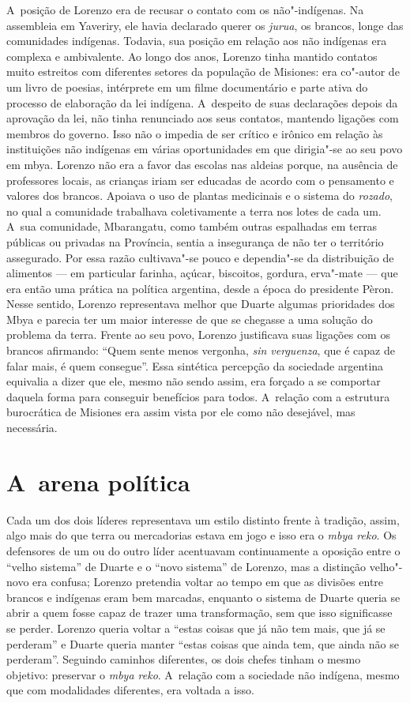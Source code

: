 A~posição de Lorenzo era de recusar o contato com os não"-indígenas. Na
assembleia em Yaveriry, ele havia declarado querer os \emph{jurua}, os
brancos, longe das comunidades indígenas. Todavia, sua posição em
relação aos não indígenas era complexa e ambivalente. Ao longo dos
anos, Lorenzo tinha mantido contatos muito estreitos com diferentes
setores da população de Misiones: era co"-autor de um livro de poesias,
intérprete em um filme documentário e parte ativa do processo de
elaboração da lei indígena. A~despeito de suas declarações depois da
aprovação da lei, não tinha renunciado aos seus contatos, mantendo
ligações com membros do governo. Isso não o impedia de ser crítico e
irônico em relação às instituições não indígenas em várias
oportunidades em que dirigia"-se ao seu povo em mbya. Lorenzo não era a
favor das escolas nas aldeias porque, na ausência de professores
locais, as crianças iriam ser educadas de acordo com o pensamento e
valores dos brancos. Apoiava o uso de plantas medicinais e o sistema do
\emph{rozado}, no qual a comunidade trabalhava coletivamente a terra nos lotes
de cada um. A~sua comunidade, Mbarangatu, como também outras espalhadas
em terras públicas ou privadas na Província, sentia a insegurança de
não ter o território assegurado. Por essa razão cultivava"-se pouco e
dependia"-se da distribuição de alimentos --- em particular farinha,
açúcar, biscoitos, gordura, erva"-mate --- que era então uma prática na
política argentina, desde a época do presidente Pèron. Nesse sentido,
Lorenzo representava melhor que Duarte algumas prioridades dos Mbya e
parecia ter um maior interesse de que se chegasse a uma solução do
problema da terra. Frente ao seu povo, Lorenzo justificava suas
ligações com os brancos afirmando: ``Quem sente menos vergonha, \emph{sin
verguenza}, que é capaz de falar mais, é quem consegue''. Essa sintética
percepção da sociedade argentina equivalia a dizer que ele, mesmo não
sendo assim, era forçado a se comportar daquela forma para conseguir
benefícios para todos. A~relação com a estrutura burocrática de
Misiones era assim vista por ele como não desejável, mas necessária.

\section{A~arena política} 

Cada um dos dois líderes representava um estilo distinto frente à
tradição, assim, algo mais do que terra ou mercadorias estava em jogo e
isso era o \emph{mbya reko}. Os defensores de um ou do outro líder acentuavam
continuamente a oposição entre o ``velho sistema'' de Duarte e o ``novo
sistema'' de Lorenzo, mas a distinção velho"-novo era confusa; Lorenzo
pretendia voltar ao tempo em que as divisões entre brancos e indígenas
eram bem marcadas, enquanto o sistema de Duarte queria se abrir a quem
fosse capaz de trazer uma transformação, sem que isso significasse se
perder. Lorenzo queria voltar a ``estas coisas que já não tem mais, que
já se perderam'' e Duarte queria manter ``estas coisas que ainda tem, que
ainda não se perderam''. Seguindo caminhos diferentes, os dois chefes
tinham o mesmo objetivo: preservar o \emph{mbya reko}. A~relação com a
sociedade não indígena, mesmo que com modalidades diferentes, era
voltada a isso.

